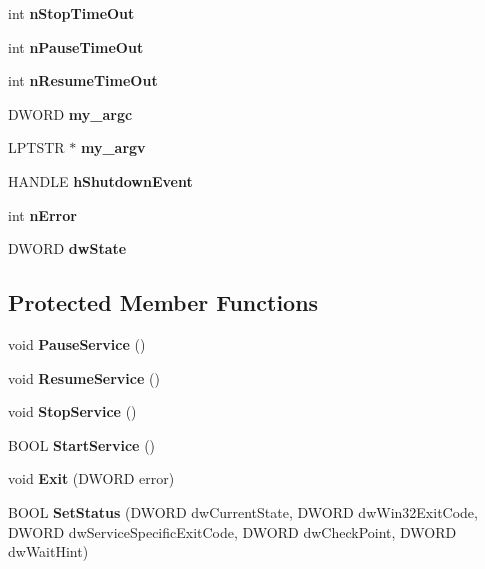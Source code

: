 \begin{DoxyCompactItemize}
int {\bfseries n\+Stop\+Time\+Out}
\item 
\mbox{\label{classNTService_ad01212676fec63307455f57fe9c16e07}} 
int {\bfseries n\+Pause\+Time\+Out}
\item 
\mbox{\label{classNTService_ada345534304dad07bc5dbe04dd0633dc}} 
int {\bfseries n\+Resume\+Time\+Out}
\item 
\mbox{\label{classNTService_aa757c90f47e05ef7573d95384c29cede}} 
D\+W\+O\+RD {\bfseries my\+\_\+argc}
\item 
\mbox{\label{classNTService_af012f5a3a359689997e1f75e6321f667}} 
L\+P\+T\+S\+TR $\ast$ {\bfseries my\+\_\+argv}
\item 
\mbox{\label{classNTService_a6dbb461d5120f09a69dd76267b4bb076}} 
H\+A\+N\+D\+LE {\bfseries h\+Shutdown\+Event}
\item 
\mbox{\label{classNTService_a73fbb4a4ef71ebe6854d43ce5949e158}} 
int {\bfseries n\+Error}
\item 
\mbox{\label{classNTService_acee969cecee4dbfb0a97a018d3b36e3b}} 
D\+W\+O\+RD {\bfseries dw\+State}
\end{DoxyCompactItemize}
\subsection*{Protected Member Functions}
\begin{DoxyCompactItemize}
\item 
\mbox{\label{classNTService_aa7c126a3480200df1cacf42bbea6be18}} 
void {\bfseries Pause\+Service} ()
\item 
\mbox{\label{classNTService_a5fec0021248fa67034c666052c38aa13}} 
void {\bfseries Resume\+Service} ()
\item 
\mbox{\label{classNTService_a5e89775601beaff88232c33e9e165e66}} 
void {\bfseries Stop\+Service} ()
\item 
\mbox{\label{classNTService_a5598d7f7453267f8ce39663f895e0780}} 
B\+O\+OL {\bfseries Start\+Service} ()
\item 
\mbox{\label{classNTService_a2f911c64d46aac900030949aede659c0}} 
void {\bfseries Exit} (D\+W\+O\+RD error)
\item 
\mbox{\label{classNTService_ac93492b55a1f00e0a6330642bdd4ca87}} 
B\+O\+OL {\bfseries Set\+Status} (D\+W\+O\+RD dw\+Current\+State, D\+W\+O\+RD dw\+Win32\+Exit\+Code, D\+W\+O\+RD dw\+Service\+Specific\+Exit\+Code, D\+W\+O\+RD dw\+Check\+Point, D\+W\+O\+RD dw\+Wait\+Hint)
\end{DoxyCompactItemize}
